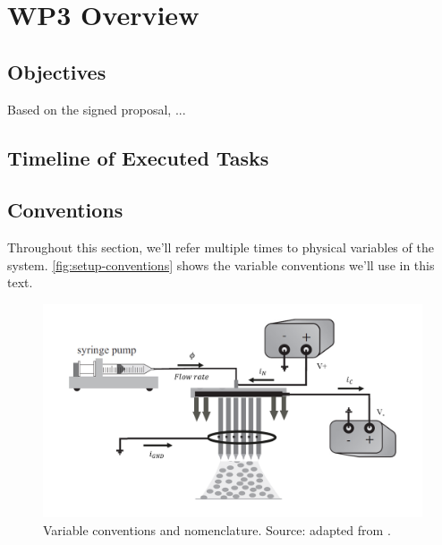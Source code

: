 \documentclass[oneside,12pt]{article}
\begin{document}
\setlength{\parindent}{0 em}  %
\setlength{\parskip}{0.7 em}    %

\newpage    \pagestyle{empty}
\tableofcontents
\pagestyle{fancy}
\newpage

\section{WP3 Overview}

\subsection{Objectives}

Based on the signed proposal, ... 

\subsection{Timeline of Executed Tasks}

\subsection{Conventions}

Throughout this section, we'll refer multiple times to physical variables of the system. \autoref{fig:setup-conventions}
shows the variable conventions we'll use in this text.

\begin{figure}[h!]
    \centering
    \includegraphics[width=.9\textwidth,trim=1 1 1 1,clip]{figures/setup-conventions.png}
    \caption{Variable conventions and nomenclature. Source: adapted from \cite{Verdoold2013}.}
    \label{fig:setup-conventions}
\end{figure}
\end{document}
